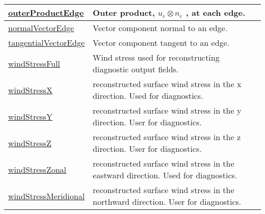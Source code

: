 {\begin{center}
\begin{longtable}{| p{2.0in} | p{4.0in} |}
	\hline
	\hyperref[subsec:var_sec_scratch_outerProductEdge]{outerProductEdge} &  Outer product,  $u_e \otimes n_e$ , at each edge. \\
	\hline
	\hyperref[subsec:var_sec_scratch_normalVectorEdge]{normalVectorEdge} & Vector component normal to an edge. \\
	\hline
	\hyperref[subsec:var_sec_scratch_tangentialVectorEdge]{tangentialVectorEdge} & Vector component tangent to an edge. \\
	\hline
	\hyperref[subsec:var_sec_scratch_windStressFull]{windStressFull} & Wind stress used for reconstructing diagnostic output fields. \\
	\hline
	\hyperref[subsec:var_sec_scratch_windStressX]{windStressX} & reconstructed surface wind stress in the x direction. Used for diagnostics. \\
	\hline
	\hyperref[subsec:var_sec_scratch_windStressY]{windStressY} & reconstructed surface wind stress in the y direction. User for diagnostics. \\
	\hline
	\hyperref[subsec:var_sec_scratch_windStressZ]{windStressZ} & reconstructed surface wind stress in the z direction. User for diagnostics. \\
	\hline
	\hyperref[subsec:var_sec_scratch_windStressZonal]{windStressZonal} & reconstructed surface wind stress in the eastward direction. Used for diagnostics. \\
	\hline
	\hyperref[subsec:var_sec_scratch_windStressMeridional]{windStressMeridional} & reconstructed surface wind stress in the northward direction. User for diagnostics. \\
	\hline
\end{longtable}
\end{center}
}
